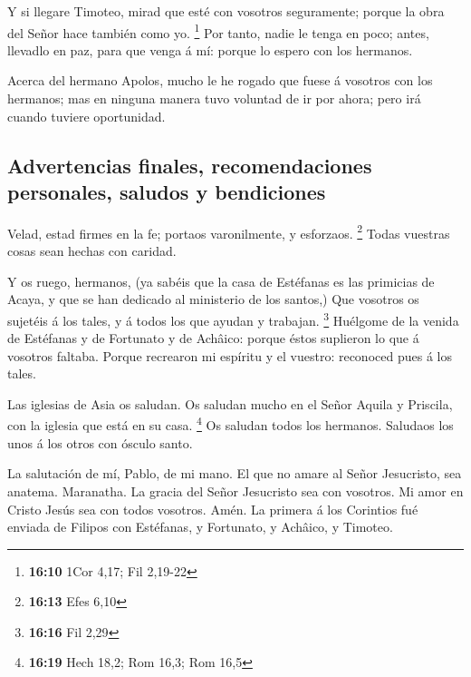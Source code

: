  Y si llegare Timoteo, mirad que esté con vosotros
seguramente; porque la obra del Señor hace también como yo. \footnote{\textbf{16:10}
  1Cor 4,17; Fil 2,19-22}  Por tanto, nadie le tenga en
poco; antes, llevadlo en paz, para que venga á mí: porque lo espero con
los hermanos.

 Acerca del hermano Apolos, mucho le he rogado que fuese
á vosotros con los hermanos; mas en ninguna manera tuvo voluntad de ir
por ahora; pero irá cuando tuviere oportunidad.

\hypertarget{advertencias-finales-recomendaciones-personales-saludos-y-bendiciones}{%
\subsection{Advertencias finales, recomendaciones personales, saludos y
bendiciones}\label{advertencias-finales-recomendaciones-personales-saludos-y-bendiciones}}

 Velad, estad firmes en la fe; portaos varonilmente, y
esforzaos. \footnote{\textbf{16:13} Efes 6,10}  Todas
vuestras cosas sean hechas con caridad.

 Y os ruego, hermanos, (ya sabéis que la casa de
Estéfanas es las primicias de Acaya, y que se han dedicado al ministerio
de los santos,)  Que vosotros os sujetéis á los tales, y
á todos los que ayudan y trabajan. \footnote{\textbf{16:16} Fil 2,29}
 Huélgome de la venida de Estéfanas y de Fortunato y de
Achâico: porque éstos suplieron lo que á vosotros faltaba.
 Porque recrearon mi espíritu y el vuestro: reconoced
pues á los tales.

 Las iglesias de Asia os saludan. Os saludan mucho en el
Señor Aquila y Priscila, con la iglesia que está en su casa. \footnote{\textbf{16:19}
  Hech 18,2; Rom 16,3; Rom 16,5}  Os saludan todos los
hermanos. Saludaos los unos á los otros con ósculo santo.

 La salutación de mí, Pablo, de mi mano. 
El que no amare al Señor Jesucristo, sea anatema. Maranatha.
 La gracia del Señor Jesucristo sea con vosotros.
 Mi amor en Cristo Jesús sea con todos vosotros. Amén. La
primera á los Corintios fué enviada de Filipos con Estéfanas, y
Fortunato, y Achâico, y Timoteo.
